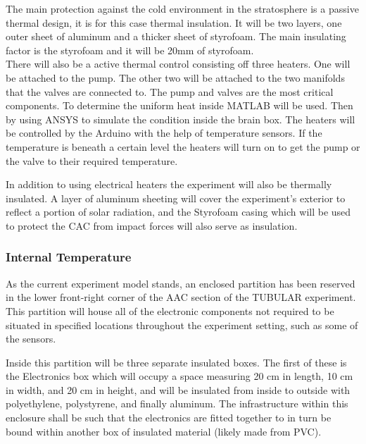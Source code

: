 The main protection against the cold environment in the stratosphere is a passive thermal design, it is for this case thermal insulation. It will be two layers, one outer sheet of aluminum and a thicker sheet of styrofoam. The main insulating factor is the styrofoam and it will be 20mm of styrofoam. \\
There will also be a active thermal control consisting off three heaters. One will be attached to the pump. The other two will be attached to the two manifolds that the valves are connected to. The pump and valves are the most critical components. To determine the uniform heat inside MATLAB will be used. Then by using ANSYS to simulate the condition inside the brain box.
The heaters will be controlled by the Arduino with the help of temperature sensors. If the temperature is beneath a certain level the heaters will turn on to get the pump or the valve to their required temperature.
%

\begin{centering}
In addition to using electrical heaters the experiment will also be thermally insulated. A layer of aluminum sheeting will cover the experiment's exterior to reflect a portion of solar radiation, and the Styrofoam casing which will be used to protect the CAC from impact forces will also serve as insulation. %
\end{centering}



\pagebreak


\raggedbottom

\subsubsection{Internal Temperature}

As the current experiment model stands, an enclosed partition has been reserved in the lower front-right corner of the AAC section of the TUBULAR experiment. This partition will house all of the electronic components not required to be situated in specified locations throughout the experiment setting, such as some of the sensors. 

Inside this partition will be three separate insulated boxes. The first of these is the Electronics box which will occupy a space measuring 20 cm in length, 10 cm in width, and 20 cm in height, and will be insulated from inside to outside with polyethylene, polystyrene, and finally aluminum. The infrastructure within this enclosure shall be such that the electronics are fitted together to in turn be bound within another box of insulated material (likely made from PVC). 

